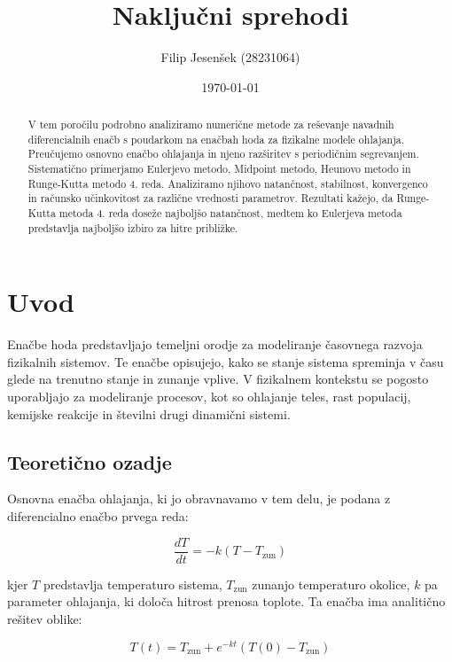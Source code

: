 \documentclass[12pt,a4paper]{article}
\title{Naključni sprehodi}
\author{Filip Jesenšek (28231064)}
\date{\today}
\begin{document}
\maketitle

\begin{abstract}
V tem poročilu podrobno analiziramo numerične metode za reševanje navadnih diferencialnih enačb 
s poudarkom na enačbah hoda za fizikalne modele ohlajanja. 
Preučujemo osnovno enačbo ohlajanja in njeno razširitev s periodičnim segrevanjem. 
Sistematično primerjamo Eulerjevo metodo, Midpoint metodo, Heunovo metodo in Runge-Kutta metodo 
4. reda. 
Analiziramo njihovo natančnost, stabilnost, konvergenco in računsko učinkovitost za 
različne vrednosti parametrov. 
Rezultati kažejo, da Runge-Kutta metoda 4. reda doseže najboljšo natančnost, 
medtem ko Eulerjeva metoda predstavlja najboljšo izbiro za hitre približke.
\end{abstract}

\newpage

\section{Uvod}

Enačbe hoda predstavljajo temeljni orodje za modeliranje časovnega razvoja fizikalnih sistemov. 
Te enačbe opisujejo, kako se stanje sistema spreminja v času glede na trenutno stanje in zunanje vplive. 
V fizikalnem kontekstu se pogosto uporabljajo za modeliranje procesov, kot so ohlajanje teles, 
rast populacij, kemijske reakcije in številni drugi dinamični sistemi.

\subsection{Teoretično ozadje}

Osnovna enačba ohlajanja, ki jo obravnavamo v tem delu, je podana z diferencialno enačbo prvega reda:

\begin{equation}
\frac{dT}{dt} = -k(T - T_{\mathrm{zun}})
\end{equation}

kjer $T$ predstavlja temperaturo sistema, $T_{\mathrm{zun}}$ zunanjo temperaturo okolice, 
$k$ pa parameter ohlajanja, ki določa hitrost prenosa toplote. 
Ta enačba ima analitično rešitev oblike:

\begin{equation}
T(t) = T_{\mathrm{zun}} + e^{-kt}(T(0) - T_{\mathrm{zun}})
\end{equation}
\end{document}
